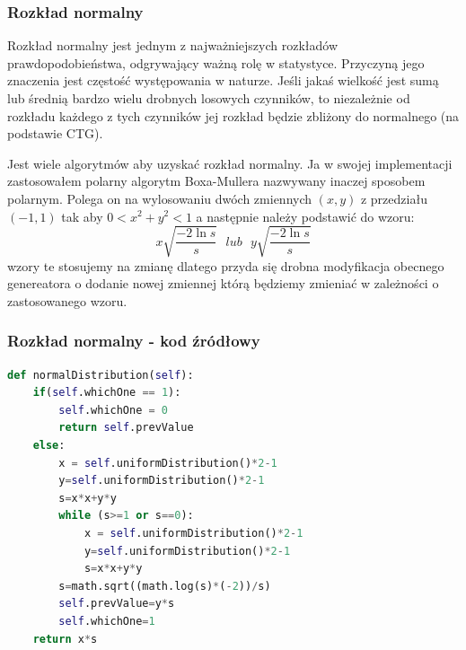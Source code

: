 \documentclass[9pt]{beamer}
\begin{document}
\begin{frame}
  \frametitle{Rozkład normalny}
  Rozkład normalny jest jednym z najważniejszych rozkładów prawdopodobieństwa, odgrywający ważną rolę w statystyce. Przyczyną jego znaczenia jest częstość występowania w naturze. Jeśli jakaś wielkość jest sumą lub średnią bardzo wielu drobnych losowych czynników, to niezależnie od rozkładu każdego z tych czynników jej rozkład będzie zbliżony do normalnego (na podstawie CTG).

  Jest wiele algorytmów aby uzyskać rozkład normalny. Ja w swojej implementacji zastosowałem polarny algorytm Boxa-Mullera nazwywany inaczej sposobem polarnym.
  Polega on na wylosowaniu dwóch zmiennych $(x,y)$ z przedziału $(-1,1)$ tak aby $0<x^2+y^2<1$ a następnie należy podstawić do wzoru:
  \begin{equation*}
    x\sqrt{\frac{-2\ln{s}}{s}} \:\: \:  lub \:\: \:  y\sqrt{\frac{-2\ln{s}}{s}}
  \end{equation*}
  wzory te stosujemy na zmianę dlatego przyda się drobna modyfikacja obecnego genereatora o dodanie nowej zmiennej którą będziemy zmieniać w zależności o zastosowanego wzoru.
\end{frame}
\begin{frame} [containsverbatim]
  \frametitle{Rozkład normalny - kod źródłowy}
  \begin{lstlisting}[language=Python, caption=Metoda rozkładu normalnego]
    def normalDistribution(self):
    if(self.whichOne == 1):
        self.whichOne = 0
        return self.prevValue
    else:
        x = self.uniformDistribution()*2-1
        y=self.uniformDistribution()*2-1
        s=x*x+y*y
        while (s>=1 or s==0):
            x = self.uniformDistribution()*2-1
            y=self.uniformDistribution()*2-1
            s=x*x+y*y
        s=math.sqrt((math.log(s)*(-2))/s)
        self.prevValue=y*s
        self.whichOne=1
    return x*s 
  \end{lstlisting}
\end{frame}
\end{document}
